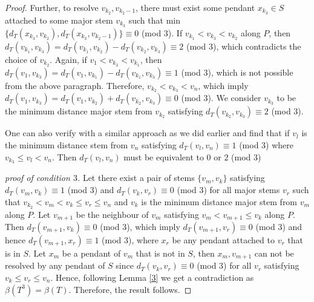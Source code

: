 \documentclass{article}
\theoremstyle{definition}
\numberwithin{equation}{section}
\begin{document}
\begin{proof}
\vspace{0.4em}
Further, to resolve $v_{k_{2}}, v_{k_{2}-1}$, there must exist some pendant $x_{k_{3}}\in S$ attached to some major stem $v_{k_{3}}$ such that min $\{d_{T}(x_{k_{3}},v_{k_{2}}), d_{T}(x_{k_{3}}, v_{k_{2}-1})\}\equiv 0$ (mod $3$). If $v_{k_{1}}<v_{k_{3}}<v_{k_{2}}$ along $P$, then $d_{T}(v_{k_{1}},v_{k_{3}})=d_{T}(v_{k_{1}},v_{k_{2}})-d_{T}(v_{k_{2}},v_{k_{3}})\equiv 2$ (mod $3$), which contradicts the choice of $v_{k_{2}}$. 
Again, if $v_{1}<v_{k_{3}}<v_{k_{1}}$, then $d_{T}(v_{1},v_{k_{3}})=d_{T}(v_{1},v_{k_{1}})-d_{T}(v_{k_{1}},v_{k_{3}})\equiv 1$ (mod $3$), which is not possible from the above paragraph. Therefore, $v_{k_{2}}<v_{k_{3}}<v_{n}$, which imply $d_{T}(v_{1},v_{k_{3}})=d_{T}(v_{1},v_{k_{2}})+d_{T}(v_{k_{2}},v_{k_{3}})\equiv 0$ (mod $3$).  We consider $v_{k_{3}}$ to be the minimum distance major stem from $v_{k_{2}}$ satisfying $d_{T}(v_{k_{2}},v_{k_{3}})\equiv 2$ (mod $3$).

\vspace{0.4em}
One can also verify with a similar approach as we did earlier and find that if $v_{l}$ is the minimum distance stem from $v_{n}$ satisfying $d_{T}(v_{l},v_{n})\equiv 1$ (mod $3$) where $v_{k_{3}}\leq v_{l}<v_{n}$. Then $d_{T}(v_{l},v_{n})$ must be equivalent to $0$ or $2$ (mod $3$)
   
\vspace{0.4em}
\noindent \textit{proof of condition $3$.} Let there exist a pair of stems $\{v_{m},v_{k}\}$ satisfying $d_{T}(v_{m},v_{k})\equiv 1$ (mod $3$) and $d_{T}(v_{k},v_{r})\equiv 0$ (mod $3$) for all major stems $v_{r}$ such that $v_{k_{2}}<v_{m}<v_{k}\leq v_{r}\leq v_{n}$ and $v_{k}$ is the minimum distance 
major stem from $v_{m}$ along $P$. Let $v_{m+1}$ be the neighbour of $v_{m}$ satisfying $v_{m}<v_{m+1}\leq v_{k}$ along $P$. Then $d_{T}(v_{m+1},v_{k})\equiv 0$ (mod $3$), which imply $d_{T}(v_{m+1},v_{r})\equiv 0$ (mod $3$) and hence $d_{T}(v_{m+1},x_{r})\equiv 1$ (mod $3$), where $x_{r}$ be any pendant attached to $v_{r}$ that is in $S$. Let $x_{m}$ be a pendant of $v_{m}$ that is not in $S$, then $x_{m},v_{m+1}$ can not be resolved by any pendant of $S$ since $d_{T}(v_{k},v_{r})\equiv 0$ (mod $3$) for all $v_{r}$ satisfying $v_{k}\leq v_{r}\leq v_{n}$. Hence, following Lemma \ref{3} we get a contradiction as $\beta{(T^{3})}=\beta{(T)}$. Therefore, the result follows.


\end{proof}
\end{document}
